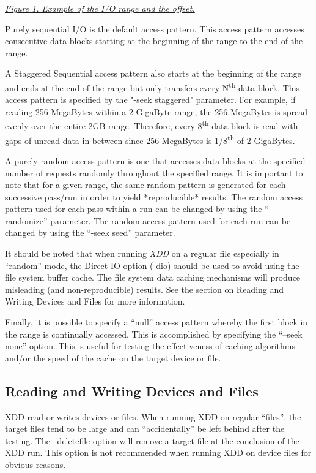 \emph{\ul{Figure 1. Example of the I/O range and the offset.}}

Purely sequential I/O is the default access pattern. This access pattern accesses consecutive data blocks starting at the beginning of the range to the end of the range.

A Staggered Sequential access pattern also starts at the beginning of the range and ends at the end of the range but only transfers every N\textsuperscript{th} data block. This access pattern is specified by the "-seek staggered" parameter. For example, if reading 256 MegaBytes within a 2 GigaByte range, the 256 MegaBytes is spread evenly over the entire 2GB range. Therefore, every 8\textsuperscript{th} data block is read with gaps of unread data in between since 256 MegaBytes is 1/8\textsuperscript{th} of 2 GigaBytes.

A purely random access pattern is one that accesses data blocks at the specified number of requests randomly throughout the specified range. It is important to note that for a given range, the same random pattern is generated for each successive pass/run in order to yield *reproducible* results. The random access pattern used for each pass within a run can be changed by using the ``-randomize'' parameter. The random access pattern used for each run can be changed by using the ``-seek seed'' parameter.

It should be noted that when running \emph{XDD} on a regular file especially in ``random'' mode, the Direct IO option (-dio) should be used to avoid using the file system buffer cache. The file system data caching mechanisms will produce misleading (and non-reproducible) results. See the section on Reading and Writing Devices and Files for more information.

Finally, it is possible to specify a ``null'' access pattern whereby the first block in the range is continually accessed. This is accomplished by specifying the ``--seek none'' option. This is useful for testing the effectiveness of caching algorithms and/or the speed of the cache on the target device or file.

\subsection{Reading and Writing Devices and Files}\label{reading-and-writing-devices-and-files}

XDD read or writes devices or files. When running XDD on regular ``files'', the target files tend to be large and can ``accidentally'' be left behind after the testing. The --deletefile option will remove a target file at the conclusion of the XDD run. This option is not recommended when running XDD on device files for obvious reasons.


